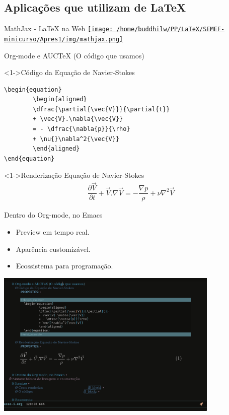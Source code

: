 \documentclass[bigger]{beamer}
\begin{document}
\subsection{Aplicações que utilizam de \LaTeX{}}
\label{sec:orgba3df46}
\begin{frame}[label={sec:org49f0964}]{MathJax - \LaTeX{} na Web}
\href{img/mathjax.png}{\texttt{[image: /home/buddhilw/PP/LaTeX/SEMEF-minicurso/Apres1/img/mathjax.png]}}
\end{frame}


\begin{frame}[label={sec:orgdc8bcfe},fragile]{Org-mode e AUCTeX (O código que usamos)}
 \begin{block}<1->{Código da Equação de Navier-Stokes}
\begin{verbatim}
\begin{equation}
        \begin{aligned}
        \dfrac{\partial{\vec{V}}}{\partial{t}}
        + \vec{V}.\nabla{\vec{V}}
        = - \dfrac{\nabla{p}}{\rho}
        + \nu{}\nabla^2{\vec{V}}
        \end{aligned}
\end{equation}
\end{verbatim}
\end{block}

\begin{block}<1->{Renderização Equação de Navier-Stokes}
\begin{equation}
        \begin{aligned}
        \dfrac{\partial{\vec{V}}}{\partial{t}} + \vec{V}.\nabla{\vec{V}} = - \dfrac{\nabla{p}}{\rho} + \nu{}\nabla^2{\vec{V}}
        \end{aligned}
\end{equation}
\end{block}
\end{frame}

\begin{frame}[label={sec:org3b994a3}]{Dentro do Org-mode, no Emacs}
\begin{itemize}[<+->]
\item Preview em tempo real.
\item Aparência customizável.
\item Ecossistema para programação.
\end{itemize}

\href{img/orgmode-auctex.png}{\includegraphics[center,width=0.8\textwidth]{./img/orgmode-auctex2.png}}
\end{frame}
\end{document}
